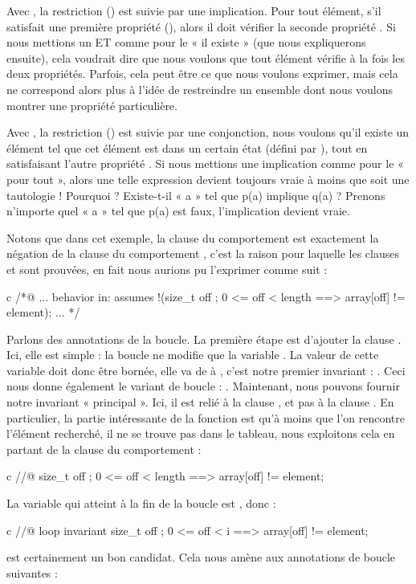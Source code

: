 Avec , la restriction
() est suivie par une implication. Pour tout élément, s'il
satisfait une première propriété (), alors il doit vérifier la
seconde propriété . Si nous mettions un ET comme pour le « il
existe » (que nous expliquerons ensuite), cela voudrait dire que nous voulons
que tout élément vérifie à la fois les deux propriétés. Parfois, cela peut être
ce que nous voulons exprimer, mais cela ne correspond alors plus à l'idée de
restreindre un ensemble dont nous voulons montrer une propriété particulière.


Avec , la restriction
() est suivie par une conjonction, nous voulons qu'il existe un
élément tel que cet élément est dans un certain état (défini par ),
tout en satisfaisant l'autre propriété . Si nous mettions une
implication comme pour le « pour tout », alors une telle expression devient
toujours vraie à moins que  soit une tautologie ! Pourquoi ?
Existe-t-il « a » tel que p(a) implique q(a) ? Prenons n'importe quel « a » tel
que p(a) est faux, l'implication devient vraie.


Notons que dans cet exemple, la clause  du comportement
 est exactement la négation de la clause 
du comportement , c'est la raison pour laquelle les clauses
 et  sont prouvées, en fait nous
aurions pu l'exprimer comme suit :


\begin{CodeBlock}{c}
  /*@ ...
    behavior in:
      assumes !(\forall size_t off ; 0 <= off < length ==> array[off] != element);
    ...
  */
\end{CodeBlock}


Parlons des annotations de la boucle. La première étape est d'ajouter la clause
. Ici, elle est simple : la boucle ne modifie que la
variable . La valeur de cette variable doit donc être bornée, elle
va de  à , c'est notre premier invariant :
. Ceci nous donne également le variant de boucle :
. Maintenant, nous pouvons fournir notre invariant
« principal ». Ici, il est relié à la clause , et pas à la
clause . En particulier, la partie intéressante de la
fonction est qu'à moins que l'on rencontre l'élément recherché, il ne se trouve
pas dans le tableau, nous exploitons cela en partant de la clause
 du comportement  :
\begin{CodeBlock}{c}
  //@ \forall size_t off ; 0 <= off < length ==> array[off] != element;
\end{CodeBlock}
La variable qui atteint  à la fin de la boucle est
, donc :
\begin{CodeBlock}{c}
  //@ loop invariant \forall size_t off ; 0 <= off < i ==> array[off] != element;
\end{CodeBlock}
est certainement un bon candidat. Cela nous amène aux annotations de boucle
suivantes :


